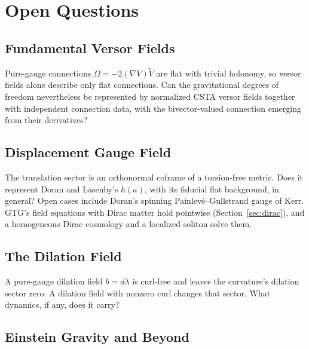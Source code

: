 \documentclass[11pt,a4paper]{article}
\newcommand{\Om}{\Omega}
\newcommand{\rev}[1]{\widetilde{#1}}
\begin{document}
\section{Open Questions}
\label{sec:questions}

\subsection{Fundamental Versor Fields}

Pure-gauge connections \(\Om=-2(\nabla V)\rev V\) are flat with
trivial holonomy, so versor fields alone describe only flat
connections. Can the gravitational degrees of freedom nevertheless be
represented by normalized CSTA versor fields together with independent
connection data, with the bivector-valued connection emerging from
their derivatives?

\subsection{Displacement Gauge Field}

The translation sector is an orthonormal coframe of a torsion-free
metric. Does it represent Doran and Lasenby's \(h(a)\), with its
fiducial flat background, in general? Open cases include Doran's
spinning Painlev\'e--Gullstrand gauge of Kerr. GTG's field equations
with Dirac matter hold pointwise (Section~\ref{sec:dirac}), and a
homogeneous Dirac cosmology and a localized soliton solve them.

\subsection{The Dilation Field}

A pure-gauge dilation field \(b=d\lambda\) is curl-free and leaves the
curvature's dilation sector zero. A dilation field with nonzero curl
changes that sector. What dynamics, if any, does it carry?

\subsection{Einstein Gravity and Beyond}
\end{document}
